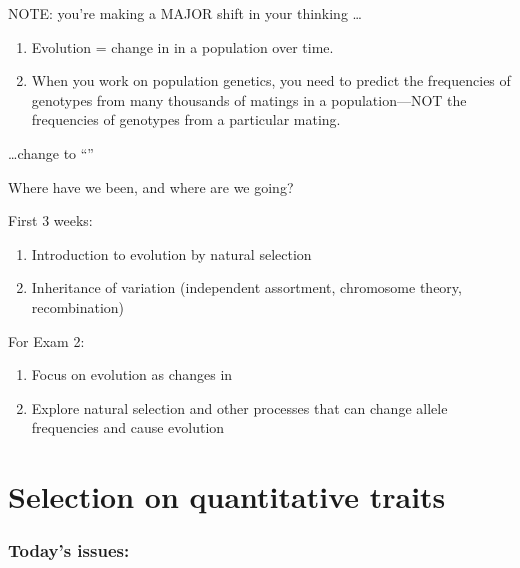 \begin{frame}
    NOTE: you're making a MAJOR shift in your thinking \ldots

    \vspace{0.5cm}
    \begin{enumerate}
        \item Evolution = change in  in a
            population over time.
        \item When you work on population genetics, you need to predict the
            frequencies of genotypes from many thousands of matings in a
            population---NOT the frequencies of genotypes from a particular
            mating. 
    \end{enumerate}

    \vspace{0.5cm}
    \ldots change to ``''
\end{frame}

\begin{frame}
    Where have we been, and where are we going? 

    \vspace{0.5cm}
    First 3 weeks:
    \begin{enumerate}
        \item Introduction to evolution by natural selection   
        \item Inheritance of variation (independent assortment, chromosome
            theory, recombination)
    \end{enumerate}

    \vspace{0.5cm}
    For Exam 2: 
    \begin{enumerate}
        \item Focus on evolution as changes in 
        \item Explore natural selection and other processes that can change
            allele frequencies and cause evolution
    \end{enumerate}
\end{frame}

\section{Selection on quantitative traits}

\begin{noheadline}
\begin{frame}
\frametitle{Today's issues:}
\tableofcontents[currentsection]
\end{frame}
\end{noheadline}

